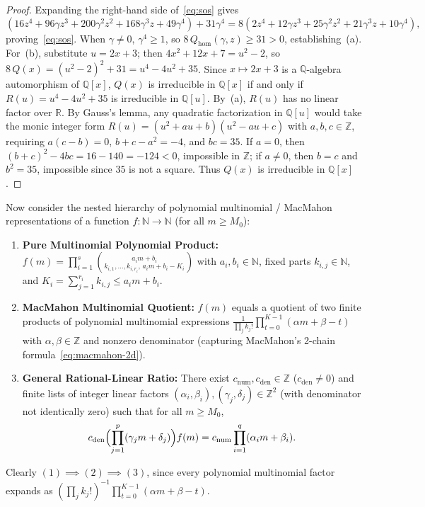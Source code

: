 \documentclass[11pt,a4paper]{article}
\theoremstyle{definition}
\begin{document}
\begin{proof}
Expanding the right-hand side of~\eqref{eq:sos} gives
\[
  (16z^4 + 96\gamma z^3 + 200\gamma^2 z^2 + 168\gamma^3 z + 49\gamma^4) + 31\gamma^4
  = 8(2z^4 + 12\gamma z^3 + 25\gamma^2 z^2 + 21\gamma^3 z + 10\gamma^4),
\]
proving~\eqref{eq:sos}. When $\gamma \ne 0$, $\gamma^4 \ge 1$, so $8\,Q_{\mathrm{hom}}(\gamma, z)
\ge 31 > 0$, establishing~(a). For~(b), substitute $u = 2x + 3$; then $4x^2 + 12x + 7 = u^2 - 2$,
so $8\,Q(x) = (u^2 - 2)^2 + 31 = u^4 - 4u^2 + 35$. Since $x \mapsto 2x + 3$ is a $\mathbb{Q}$-algebra
automorphism of $\mathbb{Q}[x]$, $Q(x)$ is irreducible in $\mathbb{Q}[x]$ if and only if $R(u) =
u^4 - 4u^2 + 35$ is irreducible in $\mathbb{Q}[u]$. By~(a), $R(u)$ has no linear factor over
$\mathbb{R}$. By Gauss's lemma, any quadratic factorization in $\mathbb{Q}[u]$ would take the monic
integer form $R(u) = (u^2 + au + b)(u^2 - au + c)$ with $a, b, c \in \mathbb{Z}$, requiring
$a(c - b) = 0$, $b + c - a^2 = -4$, and $bc = 35$. If $a = 0$, then $(b+c)^2 - 4bc = 16 - 140 =
-124 < 0$, impossible in $\mathbb{Z}$; if $a \ne 0$, then $b = c$ and $b^2 = 35$, impossible since
$35$ is not a square. Thus $Q(x)$ is irreducible in $\mathbb{Q}[x]$.
\end{proof}

Now consider the nested hierarchy of polynomial multinomial / MacMahon representations of a function
$f : \mathbb{N} \to \mathbb{N}$ (for all $m \ge M_0$):
\begin{enumerate}
  \item[(1)] \textbf{Pure Multinomial Polynomial Product:} $f(m) = \prod_{i=1}^s \binom{a_i m + b_i}{k_{i,1},
        \dots, k_{i,r_i},\, a_i m + b_i - K_i}$ with $a_i, b_i \in \mathbb{N}$, fixed parts
        $k_{i,j} \in \mathbb{N}$, and $K_i = \sum_{j=1}^{r_i} k_{i,j} \le a_i m + b_i$.
  \item[(2)] \textbf{MacMahon Multinomial Quotient:} $f(m)$ equals a quotient of two finite products of
        polynomial multinomial expressions $\frac{1}{\prod_j k_j!} \prod_{t=0}^{K-1}(\alpha m +
        \beta - t)$ with $\alpha, \beta \in \mathbb{Z}$ and nonzero denominator (capturing
        MacMahon's 2-chain formula~\eqref{eq:macmahon-2d}).
  \item[(3)] \textbf{General Rational-Linear Ratio:} There exist $c_{\mathrm{num}}, c_{\mathrm{den}} \in
        \mathbb{Z}$ ($c_{\mathrm{den}} \ne 0$) and finite lists of integer linear factors
        $(\alpha_i, \beta_i), (\gamma_j, \delta_j) \in \mathbb{Z}^2$ (with denominator not
        identically zero) such that for all $m \ge M_0$,
        \begin{equation}\label{eq:rat-lin}
          c_{\mathrm{den}} \Bigl(\prod_{j=1}^p (\gamma_j m + \delta_j)\Bigr) f(m)
          = c_{\mathrm{num}} \prod_{i=1}^q (\alpha_i m + \beta_i).
        \end{equation}
\end{enumerate}
Clearly $(1) \implies (2) \implies (3)$, since every polynomial multinomial factor expands as
$(\prod_j k_j!)^{-1}\prod_{t=0}^{K-1}(\alpha m + \beta - t)$.
\end{document}
